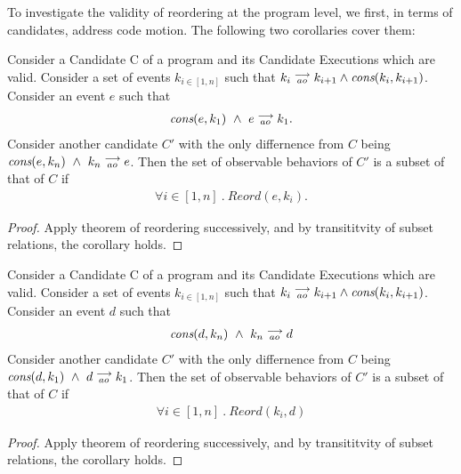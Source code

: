 To investigate the validity of reordering at the program level, we first, in terms of candidates, address code motion. The following two corollaries cover them: 
\begin{corollary}
    \label{CorollCodeMotion1}
    Consider a Candidate C of a program and its Candidate Executions which are valid. Consider a set of events $k_{i \in[1,n]}$ such that $k_i\stackrel{\longrightarrow}{_{ao}}k_{i+1} \wedge \textit{cons}(k_i,k_{i+1})$.
    Consider an event $e$ such that 
    \begin{align*}
        \textit{cons}(e,k_1) \ \wedge \ e\stackrel{\longrightarrow}{_{ao}}k_1.  
    \end{align*}
    Consider another candidate $C'$ with the only differnence from $C$ being $\cons{e}{k_n} \ \wedge \ \reln{k_n}{ao}{e}$.
    Then the set of observable behaviors of $C'$ is a subset of that of $C$ if 
    \begin{align}
        \forall i \in [1,n] \ . \ Reord(e,k_i).
    \end{align} 
\end{corollary}

\begin{proof}
    Apply theorem of reordering successively, and by transititvity of subset relations, the corollary holds.
\end{proof}

\begin{corollary}
    \label{CorollCodeMotion2}
    Consider a Candidate C of a program and its Candidate Executions which are valid. Consider a set of events $k_{i \in[1,n]}$ such that $k_i\stackrel{\longrightarrow}{_{ao}}k_{i+1} \wedge \textit{cons}(k_i,k_{i+1})$.
    Consider an event $d$ such that 
    \begin{align*}
        \textit{cons}(d,k_n) \ \wedge \ k_n\stackrel{\longrightarrow}{_{ao}}d  
    \end{align*}
    Consider another candidate $C'$ with the only differnence from $C$ being $\cons{d}{k_1} \ \wedge \ \reln{d}{ao}{k_1}$.
    Then the set of observable behaviors of $C'$ is a subset of that of $C$ if 
    \begin{align}
        \forall i \in [1,n] \ . \ Reord(k_i,d)
    \end{align} 
\end{corollary}

\begin{proof}
    Apply theorem of reordering successively, and by transititvity of subset relations, the corollary holds.
\end{proof}

